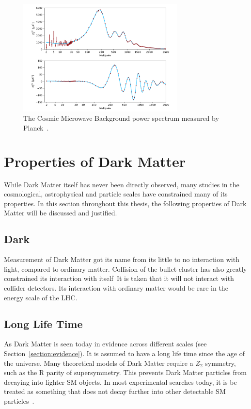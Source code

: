 \begin{figure}[!htb]
    \begin{center}
        \includegraphics[width=0.75\textwidth]{figures/chapter_DM/CMB-angular-power-spectrum}
        \caption{
			The Cosmic Microwave Background power spectrum measured by Planck~\cite{CMB}.
        }
        \label{fig:CMBfigure}
    \end{center}
\end{figure}

\section{Properties of Dark Matter}
\label{section:properties}
While Dark Matter itself has never been directly observed, many studies in the cosmological, astrophysical and particle scales have constrained many of its properties. In this section throughout this thesis, the following properties of Dark Matter will be discussed and justified.

\subsection{Dark}
Measurement of Dark Matter got its name from its little to no interaction with light, compared to ordinary matter. Collision of the bullet cluster has also greatly constrained its interaction with itself\  
It is taken that it will not interact with collider detectors. Its interaction with ordinary matter would be rare in the energy scale of the LHC. 

\subsection{Long Life Time}
As Dark Matter is seen today in evidence across different scales (see Section~\ref{section:evidence}). It is assumed to have a long life time since the age of the universe. Many theoretical models of Dark Matter require a $Z_{2}$ symmetry, such as the R parity of supersymmetry. This prevents Dark Matter particles from decaying into lighter SM objects. In most experimental searches today, it is be treated as something that does not decay further into other detectable SM
particles~\cite{boveia2018dark}.

